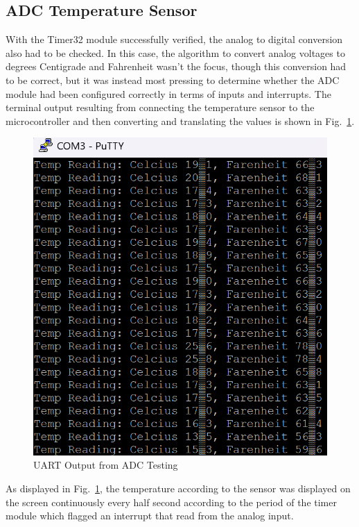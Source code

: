 \documentclass[conference]{IEEEtran}
\begin{document}

\subsection{ADC Temperature Sensor}

With the Timer32 module successfully verified, the analog to digital 
conversion also had to be checked. In this case, the algorithm to convert
analog voltages to degrees Centigrade and Fahrenheit wasn't the focus, though
this conversion had to be correct, but it was instead most pressing to
determine whether the ADC module had been configured correctly in terms of
inputs and interrupts. The terminal output resulting from connecting the
temperature sensor to the microcontroller and then converting and translating
the values is shown in Fig.~\ref{part2terminal}.

\begin{figure}
    \centering
    \includegraphics[width=\linewidth,decodearray={1 0 1 0 1 0}]{images/part2terminal2.png}
    \caption{UART Output from ADC Testing}
    \label{part2terminal}
\end{figure}

As displayed in Fig.~\ref{part2terminal}, the temperature according to the
sensor was displayed on the screen continuously every half second according to
the period of the timer module which flagged an interrupt that read from the
analog input.
\end{document}
